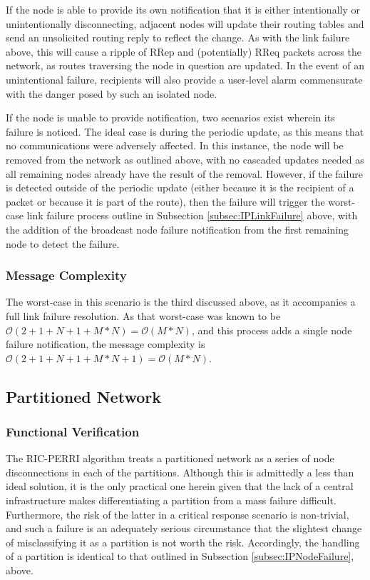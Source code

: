 If the node is able to provide its own notification that it is either intentionally or unintentionally disconnecting, adjacent nodes will update their routing tables and send an unsolicited routing reply to reflect the change. As with the link failure above, this will cause a ripple of RRep and (potentially) RReq packets across the network, as routes traversing the node in question are updated. In the event of an unintentional failure, recipients will also provide a user-level alarm commensurate with the danger posed by such an isolated node.

If the node is unable to provide notification, two scenarios exist wherein its failure is noticed. The ideal case is during the periodic update, as this means that no communications were adversely affected. In this instance, the node will be removed from the network as outlined above, with no cascaded updates needed as all remaining nodes already have the result of the removal. However, if the failure is detected outside of the periodic update (either because it is the recipient of a packet or because it is part of the route), then the failure will trigger the worst-case link failure process outline in Subsection \ref{subsec:IPLinkFailure} above, with the addition of the broadcast node failure notification from the first remaining node to detect the failure.
\subsubsection{Message Complexity}
The worst-case in this scenario is the third discussed above, as it accompanies a full link failure resolution. As that worst-case was known to be $\mathcal{O}(2 + 1 + N + 1 +M*N) = \mathcal{O}(M*N)$, and this process adds a single node failure notification, the message complexity is $\mathcal{O}(2 + 1 + N + 1 +M*N+1) = \mathcal{O}(M*N)$.

\subsection{Partitioned Network}\label{subsec:IPPartitionedNetwork}
\subsubsection{Functional Verification}
The RIC-PERRI algorithm treats a partitioned network as a series of node disconnections in each of the partitions. Although this is admittedly a less than ideal solution, it is the only practical one herein given that the lack of a central infrastructure makes differentiating a partition from a mass failure difficult. Furthermore, the risk of the latter in a critical response scenario is non-trivial, and such a failure is an adequately serious circumstance that the slightest change of misclassifying it as a partition is not worth the risk. Accordingly, the handling of a partition is identical to that outlined in Subsection \ref{subsec:IPNodeFailure}, above.

